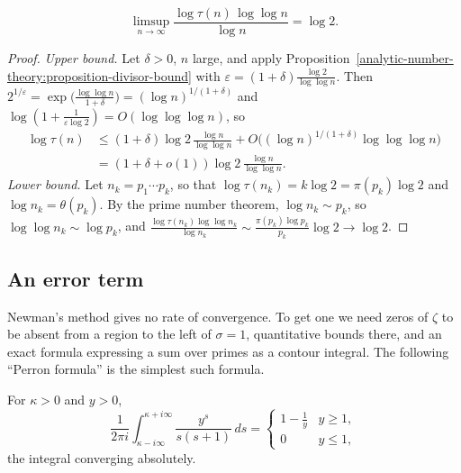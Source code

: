 \begin{theorem}[Wigert]\label{analytic-number-theory:theorem-wigert}
\[
\limsup_{n \to \infty}\frac{\log\tau(n)\,\log\log n}{\log n} = \log 2.
\]
\end{theorem}

\begin{proof}
\emph{Upper bound.} Let $\delta > 0$, $n$ large, and apply Proposition~\ref{analytic-number-theory:proposition-divisor-bound} with $\varepsilon = (1 + \delta)\frac{\log 2}{\log\log n}$. Then
$2^{1/\varepsilon} = \exp\bigl(\frac{\log\log n}{1 + \delta}\bigr) = (\log n)^{1/(1 + \delta)}$ and $\log(1 + \frac{1}{\varepsilon\log 2}) = O(\log\log\log n)$, so
\[
\begin{aligned}
\log\tau(n) &\leq (1 + \delta)\log 2\,\frac{\log n}{\log\log n} + O\bigl((\log n)^{1/(1 + \delta)}\log\log\log n\bigr) \\
&= (1 + \delta + o(1))\log 2\,\frac{\log n}{\log\log n}.
\end{aligned}
\]
\emph{Lower bound.} Let $n_k = p_1\cdots p_k$, so that $\log\tau(n_k) = k\log 2 = \pi(p_k)\log 2$ and $\log n_k = \theta(p_k)$. By the prime number theorem, $\log n_k \sim p_k$, so
$\log\log n_k \sim \log p_k$, and $\frac{\log\tau(n_k)\log\log n_k}{\log n_k} \sim \frac{\pi(p_k)\log p_k}{p_k}\log 2 \to \log 2$.
\end{proof}

\subsection{An error term}\label{analytic-number-theory:subsection-error-term}

Newman's method gives no rate of convergence. To get one we need zeros of $\zeta$ to be absent from a region to the left of $\sigma = 1$, quantitative bounds there, and an exact formula expressing
a sum over primes as a contour integral. The following ``Perron formula'' is the simplest such formula.

\begin{lemma}\label{analytic-number-theory:lemma-perron}
For $\kappa > 0$ and $y > 0$,
\[
\frac{1}{2\pi i}\int_{\kappa - i\infty}^{\kappa + i\infty}\frac{y^s}{s(s + 1)}\,ds = \begin{cases}1 - \frac1y & y \geq 1, \\ 0 & y \leq 1,\end{cases}
\]
the integral converging absolutely.
\end{lemma}

